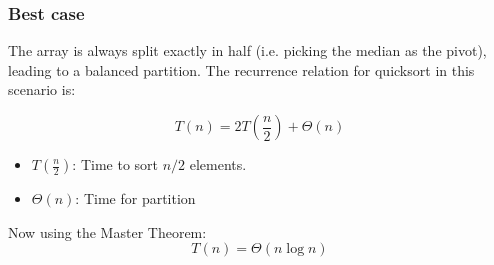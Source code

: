     \subsubsection{Best case}
    \begin{derivation}
        The array is always split exactly in half (i.e. picking the median as the pivot), leading to a balanced partition. The recurrence relation for quicksort in this scenario is:

        \begin{equation*}
            T(n) = 2T\left(\frac{n}{2}\right) + \Theta(n)
        \end{equation*}
        \begin{itemize}
            \item $T\left(\frac{n}{2}\right)$: Time to sort $n/2$ elements.
            \item $\Theta(n)$: Time for partition
        \end{itemize}

        \begin{center}
        \end{center}

        \noindent Now using the Master Theorem:
        \begin{equation*}
        T(n) = \Theta(n \log n)
        \end{equation*}
    \end{derivation}

